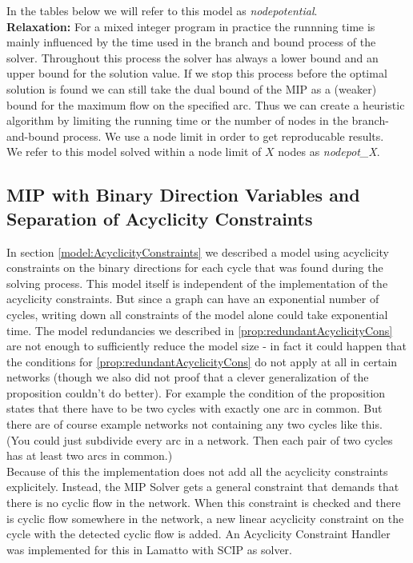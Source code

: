 In the tables below we will refer to this model as \textit{nodepotential}.\\
 
\textbf{Relaxation:} For a mixed 
integer program in practice the runnning time is mainly influenced by the time used in the branch and bound process
of the solver. Throughout this process the solver has always a lower bound and an upper bound for the solution value. 
If we stop this process before the optimal solution is found we can still take the dual bound of the MIP as a (weaker) 
bound for the maximum flow on the specified arc. Thus we can create a heuristic algorithm by limiting the running time 
or the number of nodes in the branch-and-bound process. We use a node limit in order to get reproducable results. \\

We refer to this model solved within a node limit of $X$ nodes as \textit{nodepot\_X}.
 
 
 \subsection{MIP with Binary Direction Variables and Separation of Acyclicity Constraints}
In section \ref{model:AcyclicityConstraints} we described a model using acyclicity constraints on the binary directions 
for each cycle that was found during the solving process.
This model itself is independent of the implementation of the acyclicity constraints. But since a graph can have an 
exponential number of cycles, writing down all constraints of the model alone could take exponential time. The 
model redundancies we described in \ref{prop:redundantAcyclicityCons} are not enough to sufficiently reduce the model 
size - in fact it could happen that the conditions for \ref{prop:redundantAcyclicityCons} do not apply at all in 
certain networks (though we also did not proof that a clever generalization of the proposition couldn't do better). 
For example the condition of the proposition states that there have to be two cycles with exactly one arc in common. 
But there are of course example networks not containing any two cycles like this. (You could just subdivide every arc 
in a network. Then each pair of two cycles has at least two arcs in common.)\\

Because of this the implementation does not add all the acyclicity constraints explicitely. Instead, the MIP Solver 
gets a general constraint that demands that there is no cyclic flow in the network. When this constraint is checked and 
there is cyclic flow somewhere in the network, a new linear acyclicity constraint on the cycle with the detected cyclic 
flow is added. An Acyclicity Constraint Handler was implemented for this in Lamatto \cite{lamatto} with SCIP 
\cite{scip} \cite{Achterberg2009} as solver. \\

